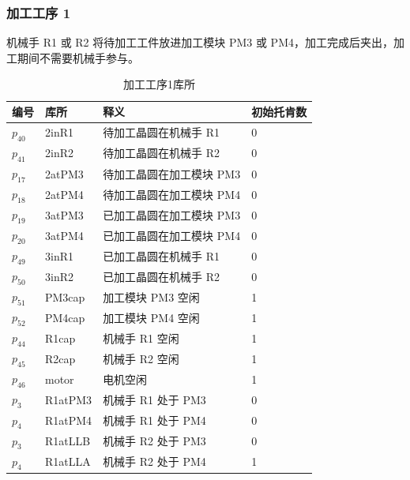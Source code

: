 \subsubsection{加工工序 1}
机械手 R1 或 R2 将待加工工件放进加工模块 PM3 或 PM4，加工完成后夹出，加工期间不需要机械手参与。

\begin{table}[H]
	\centering
	\caption{加工工序1库所}
	\begin{tabular}{llll}
		\toprule
		编号 & 库所    & 释义                     & 初始托肯数 \\
		\hline
		$p_{40}$  & 2inR1   & 待加工晶圆在机械手 R1    & 0          \\
		$p_{41}$  & 2inR2   & 待加工晶圆在机械手 R2    & 0          \\
		$p_{17}$  & 2atPM3  & 待加工晶圆在加工模块 PM3 & 0          \\
		$p_{18}$  & 2atPM4  & 待加工晶圆在加工模块 PM4 & 0          \\
		$p_{19}$  & 3atPM3  & 已加工晶圆在加工模块 PM3 & 0          \\
		$p_{20}$  & 3atPM4  & 已加工晶圆在加工模块 PM4 & 0          \\
		$p_{49}$  & 3inR1   & 已加工晶圆在机械手 R1    & 0          \\
		$p_{50}$  & 3inR2   & 已加工晶圆在机械手 R2    & 0          \\
		$p_{51}$  & PM3cap  & 加工模块 PM3 空闲        & 1          \\
		$p_{52}$  & PM4cap  & 加工模块 PM4 空闲        & 1          \\
		$p_{44}$  & R1cap   & 机械手 R1 空闲           & 1          \\
		$p_{45}$  & R2cap   & 机械手 R2 空闲           & 1          \\
		$p_{46}$  & motor   & 电机空闲                 & 1          \\
		$p_{3}$   & R1atPM3 & 机械手 R1 处于 PM3       & 0          \\
		$p_{4}$   & R1atPM4 & 机械手 R1 处于 PM4       & 0          \\
		$p_{3}$   & R1atLLB & 机械手 R2 处于 PM3       & 0          \\
		$p_{4}$   & R1atLLA & 机械手 R2 处于 PM4       & 1          \\
		\bottomrule
	\end{tabular}
\end{table}

